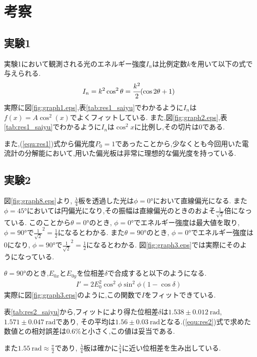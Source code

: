 \section{考察}
\subsection{実験1}
実験1において観測される光のエネルギー強度$I_n$は比例定数$k$を用いて以下の式で与えられる.\cite{rikougaku}
\begin{align}
  I_n=k^2\cos^2\theta=\cfrac{k^2}{2}(\cos 2\theta+1)
\end{align}
実際に図\ref{fig:graph1.eps},表\ref{tab:res1_saiyu}でわかるように$I_n$は$f(x)=A\cos^2(x)$でよくフィットしている.
また,図\ref{fig:graph2.eps},表\ref{tab:res1_saiyu}でわかるように$I_n$は$\cos^2x$に比例し,その切片は0である.

また,(\ref{equ:res1})式から偏光度$P_0=1$であったことから,少なくとも今回用いた電流計の分解能において,用いた偏光板は非常に理想的な偏光度を持っている.
\subsection{実験2}
図\ref{fig:graph8.eps}より, $\frac{\lambda}{4}$板を透過した光は$\phi=0\si{\degree}$において直線偏光になる.
また$\phi=45\si{\degree}$においては円偏光になり,その振幅は直線偏光のときのおよそ$\frac{1}{\sqrt{2}}$倍になっている.
このことから$\theta=0\si{\degree}$のとき, $\phi=0\si{\degree}$でエネルギー強度は最大値を取り,
$\phi=90\si{\degree}$で$\frac{1}{\sqrt{2}}^2=\frac{1}{2}$になるとわかる.
また$\theta=90\si{\degree}$のとき, $\phi=0\si{\degree}$でエネルギー強度は0になり,
$\phi=90\si{\degree}$で$\frac{1}{\sqrt{2}}^2=\frac{1}{2}$になるとわかる.
図\ref{fig:graph3.eps}では実際にそのようになっている.

$\theta=90\si{\degree}$のとき,$E_{0x}$と$E_{0y}$を位相差$\delta$で合成すると以下のようになる.
\begin{align}
  I'=2E_0^2\cos^2\phi\sin^2\phi(1-\cos\delta)
\end{align}
実際に図\ref{fig:graph3.eps}のように,この関数で$I$をフィットできている.

表\ref{tab:res2_saiyu}から,フィットにより得た位相差$\delta$は$1.538\pm0.012~\si{\radian}$, $1.571\pm0.047~\si{\radian}$であり,
その平均は$1.56\pm0.03~\si{\radian}$となる.(\ref{equ:res2})式で求めた数値との相対誤差は$0.6\%$と小さく,この値は妥当である.

また$1.55~\si{\radian}\approx\frac{\pi}{2}$であり, $\frac{\lambda}{4}$板は確かに$\frac{\lambda}{4}$に近い位相差を生み出している.
